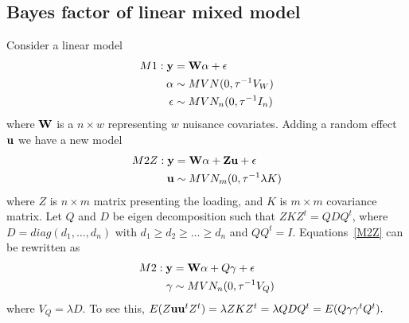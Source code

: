 \documentclass[11pt,Times]{article}
\begin{document}
\subsection{Bayes factor of linear mixed model}
Consider a linear model 
\begin{equation} \label{M1}
\begin{aligned}
M1: {\mathbf{y}} &= {\mathbf{W}} \alpha  + {\mathbf{\epsilon}} \\
\alpha &\sim MVN(0,  \tau^{-1}  V_W) \\
{\mathbf{\epsilon}} &\sim MVN_n(0, \tau^{-1} I_n)
\end{aligned}
\end{equation}
where ${\mathbf{W}}$ is a $n\times w$ representing $w$ nuisance covariates.    Adding a random effect ${\mathbf{u}}$ we have a new model 
%
\begin{equation} \label{M2Z}
\begin{aligned}
M2Z: {\mathbf{y}} &= {\mathbf{W}} \alpha  + {\mathbf{Z}} {\mathbf{u}} + {\mathbf{\epsilon}} \\
{\mathbf{u}} &\sim MVN_m(0, \tau^{-1} \lambda K) \\
\end{aligned}
\end{equation}
where $Z$ is $n \times m$ matrix presenting the loading, and $K$ is $m\times m$ covariance matrix.   
Let $Q$ and $D$ be eigen decomposition such that $ZKZ^t=QDQ^t$,   where $D=diag(d_1, \dots, d_n)$ with $d_1 \ge d_2 \ge \dots \ge d_n$ and $QQ^t = I$.  Equations~\ref{M2Z} can be rewritten as 
\begin{equation} \label{M2}
\begin{aligned}
M2: {\mathbf{y}} &= {\mathbf{W}} \alpha  + Q {\mathbf{\gamma}} + {\mathbf{\epsilon}} \\
{\mathbf{\gamma}} &\sim MVN_n(0, \tau^{-1} V_Q) \\
\end{aligned}
\end{equation}
where $V_Q = \lambda D$. To see this, $E(Z{\mathbf{u}}{\mathbf{u}}^tZ^t) = \lambda ZKZ^t = \lambda QDQ^t = E(Q\gamma \gamma^t Q^t).$ 
\end{document}
